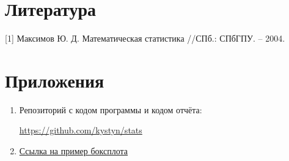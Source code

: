 \section{Литература}
[1] Максимов Ю. Д. Математическая статистика //СПб.: СПбГПУ. – 2004.


\section{Приложения}

\begin{enumerate}
	\item Репозиторий с кодом программы и кодом отчёта:
	
	\href{https://github.com/kystyn/stats}{https://github.com/kystyn/stats}
	
	\item \href{https://towardsdatascience.com/understanding-boxplots-5e2df7bcbd51}{Ссылка на пример боксплота}\label{bplotex}
\end{enumerate}